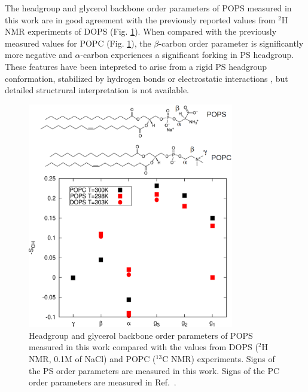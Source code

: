 \documentclass[aps,prl,superscriptaddress,twocolumn]{revtex4}
\begin{document}
The headgroup and glycerol backbone order parameters of 
POPS measured in this work are in good agreement with the previously reported
values from $^2$H NMR experiments of DOPS \cite{browning80} (Fig. \ref{HGorderParameters}).
When compared with the previously measured values for POPC \cite{ferreira13} (Fig. \ref{HGorderParameters}),
the $\beta$-carbon order parameter is significantly more negative and $\alpha$-carbon
experiences a significant forking in PS headgroup.
These features have been intepreted to arise from a rigid PS headgroup
conformation, stabilized by hydrogen bonds or electrostatic
interactions \cite{browning80,buldt81}, but detailed structrural interpretation is not
available. 
\begin{figure}[]
  \centering
  \includegraphics[width=9.0cm]{../Figs/PCPScomp.eps}
  \caption{\label{HGorderParameters}
    Headgroup and glycerol backbone order parameters of POPS measured in this work compared
    with the values from DOPS ($^2$H NMR, 0.1M of NaCl) \cite{browning80} and 
    POPC  ($^{13}$C NMR) \cite{ferreira13} experiments. Signs of the PS order parameters
    are measured in this work. Signs of the PC order parameters are measured in Ref.~\cite{ferreira16}.
  }
\end{figure}


\end{document}
